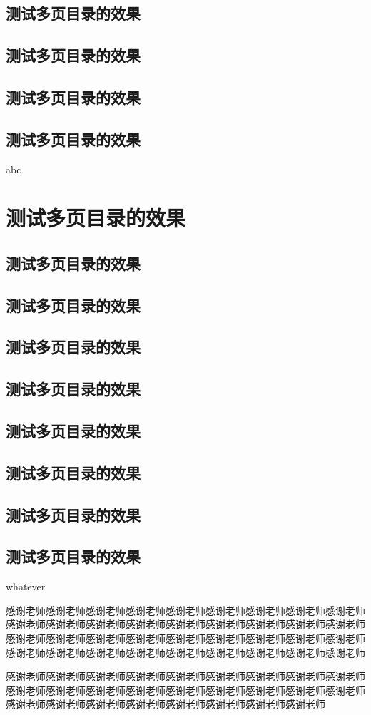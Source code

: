\documentclass[a4paper,cs4size,UTF8,winfonts,boldfont,slantfont]{ctexart}
\begin{document}
	\subsection{测试多页目录的效果}
	\subsection{测试多页目录的效果}
	\subsection{测试多页目录的效果}
	\subsection{测试多页目录的效果}
	abc
	\section{测试多页目录的效果}
	\subsection{测试多页目录的效果}
	\subsection{测试多页目录的效果}
	\subsection{测试多页目录的效果}
	\subsection{测试多页目录的效果}
	\subsection{测试多页目录的效果}
	\subsection{测试多页目录的效果}
	\subsection{测试多页目录的效果}
	\subsection{测试多页目录的效果}
	whatever
	
	\begin{thankpage}
		感谢老师感谢老师感谢老师感谢老师感谢老师感谢老师感谢老师感谢老师感谢老师感谢老师感谢老师感谢老师感谢老师感谢老师感谢老师感谢老师感谢老师感谢老师感谢老师感谢老师感谢老师感谢老师感谢老师感谢老师感谢老师感谢老师感谢老师感谢老师感谢老师感谢老师感谢老师感谢老师感谢老师感谢老师感谢老师感谢老师
		
		感谢老师感谢老师感谢老师感谢老师感谢老师感谢老师感谢老师感谢老师感谢老师感谢老师感谢老师感谢老师感谢老师感谢老师感谢老师感谢老师感谢老师感谢老师感谢老师感谢老师感谢老师感谢老师感谢老师感谢老师感谢老师感谢老师
	\end{thankpage}
	
\end{document}
